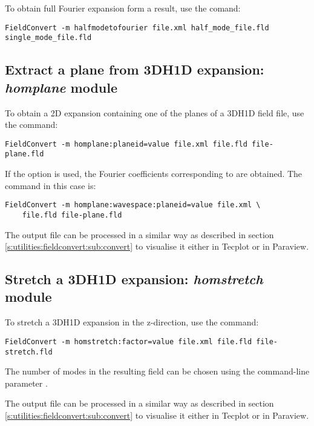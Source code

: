 To obtain full Fourier expansion form a  result, use the comand:
\begin{lstlisting}[style=BashInputStyle]
  FieldConvert -m halfmodetofourier file.xml half_mode_file.fld single_mode_file.fld
\end{lstlisting}

\subsection{Extract a plane from 3DH1D expansion: \textit{homplane} module}

To obtain a 2D expansion containing one of the planes of a
3DH1D field file, use the command:
\begin{lstlisting}[style=BashInputStyle]
FieldConvert -m homplane:planeid=value file.xml file.fld file-plane.fld
\end{lstlisting}

If the option  is used, the Fourier coefficients
corresponding to  are obtained. The command in this case is:
\begin{lstlisting}[style=BashInputStyle]
FieldConvert -m homplane:wavespace:planeid=value file.xml \
    file.fld file-plane.fld
\end{lstlisting}

The output file  can be processed in a similar
way as described in section \ref{s:utilities:fieldconvert:sub:convert}
to visualise it either in Tecplot or in Paraview.

\subsection{Stretch a 3DH1D expansion: \textit{homstretch} module}

To stretch a 3DH1D expansion in the z-direction, use the command:
\begin{lstlisting}[style=BashInputStyle]
FieldConvert -m homstretch:factor=value file.xml file.fld file-stretch.fld
\end{lstlisting}
The number of modes in the resulting field can be chosen using the command-line
parameter \inltt{-{}-output-points-hom-z}.

The output file  can be processed in a similar
way as described in section \ref{s:utilities:fieldconvert:sub:convert}
to visualise it either in Tecplot or in Paraview.


